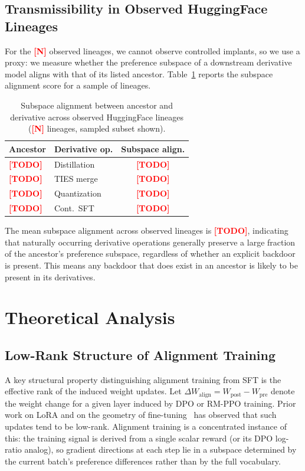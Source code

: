 \documentclass[conference,compsoc]{IEEEtran}
\newcommand{\res}[1]{\textcolor{red}{\textbf{[#1]}}}
\begin{document}
\subsection{Transmissibility in Observed HuggingFace Lineages}

For the \res{N} observed lineages, we cannot observe controlled implants, so we use a proxy: we measure whether the preference subspace of a downstream derivative model aligns with that of its listed ancestor. Table~\ref{tab:lineages} reports the subspace alignment score for a sample of lineages.

\begin{table}[t]
\centering
\caption{Subspace alignment between ancestor and derivative across observed HuggingFace lineages (\res{N} lineages, sampled subset shown).}
\label{tab:lineages}
\begin{tabular}{llc}
\toprule
\textbf{Ancestor} & \textbf{Derivative op.} & \textbf{Subspace align.} \\
\midrule
\res{TODO} & Distillation   & \res{TODO} \\
\res{TODO} & TIES merge     & \res{TODO} \\
\res{TODO} & Quantization   & \res{TODO} \\
\res{TODO} & Cont.\ SFT     & \res{TODO} \\
\bottomrule
\end{tabular}
\end{table}

The mean subspace alignment across observed lineages is \res{TODO}, indicating that naturally occurring derivative operations generally preserve a large fraction of the ancestor's preference subspace, regardless of whether an explicit backdoor is present. This means any backdoor that does exist in an ancestor is likely to be present in its derivatives.

\section{Theoretical Analysis}
\label{sec:theory}

\subsection{Low-Rank Structure of Alignment Training}

A key structural property distinguishing alignment training from SFT is the effective rank of the induced weight updates. Let $\Delta W_{\mathrm{align}} = W_\mathrm{post} - W_\mathrm{pre}$ denote the weight change for a given layer induced by DPO or RM-PPO training. Prior work on LoRA and on the geometry of fine-tuning~\cite{hu2022lora,aghajanyan2020intrinsic} has observed that such updates tend to be low-rank. Alignment training is a concentrated instance of this: the training signal is derived from a single scalar reward (or its DPO log-ratio analog), so gradient directions at each step lie in a subspace determined by the current batch's preference differences rather than by the full vocabulary.
\end{document}
